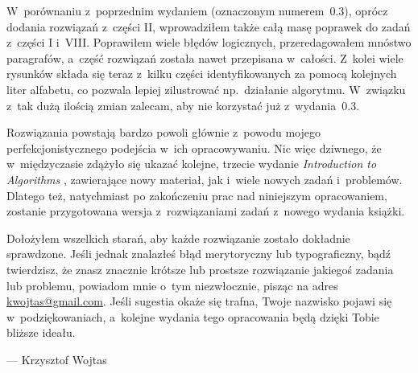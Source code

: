 W~porównaniu z~poprzednim wydaniem (oznaczonym numerem~0.3), oprócz dodania rozwiązań z~części II, wprowadziłem także całą masę poprawek do zadań z~części I i~VIII. Poprawiłem wiele błędów logicznych, przeredagowałem mnóstwo paragrafów, a~część rozwiązań została nawet przepisana w~całości. Z~kolei wiele rysunków składa się teraz z~kilku części identyfikowanych za pomocą kolejnych liter alfabetu, co pozwala lepiej zilustrować np.\ działanie algorytmu. W~związku z~tak dużą ilością zmian zalecam, aby nie korzystać już z~wydania~0.3.

Rozwiązania powstają bardzo powoli głównie z~powodu mojego perfekcjonistycznego podejścia w~ich opracowywaniu. Nic więc dziwnego, że w~międzyczasie zdążyło się ukazać kolejne, trzecie wydanie \textsl{Introduction to Algorithms} \cite{cormen3}, zawierające nowy materiał, jak i~wiele nowych zadań i~problemów. Dlatego też, natychmiast po zakończeniu prac nad niniejszym opracowaniem, zostanie przygotowana wersja z~rozwiązaniami zadań z~nowego wydania książki.

Dołożyłem wszelkich starań, aby każde rozwiązanie zostało dokładnie sprawdzone. Jeśli jednak znalazłeś błąd merytoryczny lub typograficzny, bądź twierdzisz, że znasz znacznie krótsze lub prostsze rozwiązanie jakiegoś zadania lub problemu, powiadom mnie o~tym niezwłocznie, pisząc na adres \url{kwojtas@gmail.com}. Jeśli sugestia okaże się trafna, Twoje nazwisko pojawi się w~podziękowaniach, a~kolejne wydania tego opracowania będą dzięki Tobie bliższe ideału.

\bigskip
\bigskip
{}\hfill--- Krzysztof Wojtas

\endinput